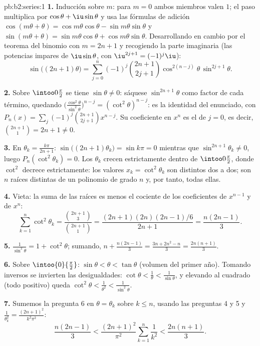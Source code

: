\begin{solution}{pb:b2:series:1}
\textbf{1.} Inducción sobre $m$: para $m = 0$ ambos miembros valen
$1$; el paso multiplica por $\cos\theta + \iu\sin\theta$ y usa las
fórmulas de adición $\cos(m\theta + \theta) = \cos
m\theta\cos\theta - \sin m\theta\sin\theta$ y $\sin(m\theta +
\theta) = \sin m\theta\cos\theta + \cos m\theta\sin\theta$.
Desarrollando en cambio por el teorema del binomio con $m = 2n+1$
y recogiendo la parte imaginaria (las potencias impares de
$\iu\sin\theta$, con $\iu^{2j+1} = (-1)^j\iu$):
\[
\sin\bigl((2n{+}1)\theta\bigr) = \sum_{j=0}^{n}(-1)^j
\binom{2n+1}{2j+1}\cos^{2(n-j)}\theta\,\sin^{2j+1}\theta .
\]

\textbf{2.} Sobre $\intoo0{\frac\pi2}$ se tiene $\sin\theta \neq
0$: sáquese $\sin^{2n+1}\theta$ como factor de cada término,
quedando $\bigl(\frac{\cos^2\theta}{\sin^2\theta}\bigr)^{n-j} =
(\cot^2\theta)^{n-j}$: es la identidad del enunciado, con $P_n(x)
= \sum_j(-1)^j\binom{2n+1}{2j+1}x^{n-j}$. Su coeficiente en
$x^n$ es el de $j = 0$, es decir, $\binom{2n+1}{1} = 2n + 1 \neq
0$.

\textbf{3.} En $\theta_k = \frac{k\pi}{2n+1}$:
$\sin\bigl((2n{+}1)\theta_k\bigr) = \sin k\pi = 0$ mientras que
$\sin^{2n+1}\theta_k \neq 0$, luego $P_n(\cot^2\theta_k) = 0$. Los
$\theta_k$ crecen estrictamente dentro de $\intoo0{\frac\pi2}$,
donde $\cot^2$ decrece estrictamente: los valores $x_k =
\cot^2\theta_k$ son distintos dos a dos; son $n$ raíces distintas
de un polinomio de grado $n$ y, por tanto, todas ellas.

\textbf{4.} Vieta: la suma de las raíces es menos el cociente de
los coeficientes de $x^{n-1}$ y de $x^n$:
\[
\sum_{k=1}^{n}\cot^2\theta_k =
\frac{\binom{2n+1}{3}}{\binom{2n+1}{1}}
= \frac{(2n+1)(2n)(2n-1)/6}{2n+1} = \frac{n(2n-1)}{3}.
\]

\textbf{5.} $\frac{1}{\sin^2\theta} = 1 + \cot^2\theta$; sumando,
$n + \frac{n(2n-1)}3 = \frac{3n + 2n^2 - n}{3} =
\frac{2n(n+1)}{3}$.

\textbf{6.} Sobre $\intoo{0}{\frac\pi2}$: $\sin\theta < \theta <
\tan\theta$ (volumen del primer año). Tomando inversos se
invierten las desigualdades: $\cot\theta < \frac1\theta <
\frac1{\sin\theta}$, y elevando al cuadrado (todo positivo) queda
$\cot^2\theta < \frac1{\theta^2} < \frac1{\sin^2\theta}$.

\textbf{7.} Sumemos la pregunta 6 en $\theta = \theta_k$ sobre $k
\leq n$, usando las preguntas 4 y 5 y $\frac1{\theta_k^2} =
\frac{(2n+1)^2}{k^2\pi^2}$:
\[
\frac{n(2n-1)}3 < \frac{(2n+1)^2}{\pi^2}\sum_{k=1}^n\frac1{k^2}
< \frac{2n(n+1)}3 .
\]


\end{solution}
